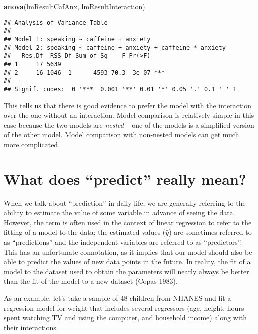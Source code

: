 \documentclass[]{book}
\newenvironment{Shaded}{\begin{snugshade}}{\end{snugshade}}
\newcommand{\KeywordTok}[1]{\textcolor[rgb]{0.13,0.29,0.53}{\textbf{#1}}}
\newcommand{\NormalTok}[1]{#1}
\theoremstyle{definition}
\theoremstyle{definition}
\theoremstyle{definition}
\theoremstyle{remark}
\begin{document}
\begin{Shaded}
\begin{Highlighting}[]
\KeywordTok{anova}\NormalTok{(lmResultCafAnx, lmResultInteraction)}
\end{Highlighting}
\end{Shaded}

\begin{verbatim}
## Analysis of Variance Table
## 
## Model 1: speaking ~ caffeine + anxiety
## Model 2: speaking ~ caffeine + anxiety + caffeine * anxiety
##   Res.Df  RSS Df Sum of Sq    F Pr(>F)    
## 1     17 5639                             
## 2     16 1046  1      4593 70.3  3e-07 ***
## ---
## Signif. codes:  0 '***' 0.001 '**' 0.01 '*' 0.05 '.' 0.1 ' ' 1
\end{verbatim}

This tells us that there is good evidence to prefer the model with the
interaction over the one without an interaction. Model comparison is
relatively simple in this case because the two models are \emph{nested}
-- one of the models is a simplified version of the other model. Model
comparison with non-nested models can get much more complicated.

\section{\texorpdfstring{What does ``predict'' really
mean?}{What does predict really mean?}}\label{what-does-predict-really-mean}

When we talk about ``prediction'' in daily life, we are generally
referring to the ability to estimate the value of some variable in
advance of seeing the data. However, the term is often used in the
context of linear regression to refer to the fitting of a model to the
data; the estimated values (\(\hat{y}\)) are sometimes referred to as
``predictions'' and the independent variables are referred to as
``predictors''. This has an unfortunate connotation, as it implies that
our model should also be able to predict the values of new data points
in the future. In reality, the fit of a model to the dataset used to
obtain the parameters will nearly always be better than the fit of the
model to a new dataset (Copas 1983).

As an example, let's take a sample of 48 children from NHANES and fit a
regression model for weight that includes several regressors (age,
height, hours spent watching TV and using the computer, and household
income) along with their interactions.
\end{document}
